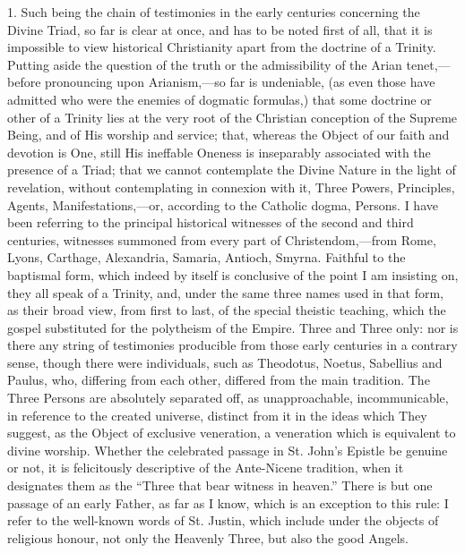 1. Such being the chain of testimonies in the early centuries
concerning the Divine Triad, so far is clear at once, and has to be
noted first of all, that it is impossible to view historical
Christianity apart from the doctrine of a Trinity. Putting aside the
question of the truth or the admissibility of the Arian tenet,—before
pronouncing upon Arianism,—so far is undeniable, (as even those have
admitted who were the enemies of dogmatic formulas,) that some
doctrine or other of a Trinity lies at the very root of the Christian
conception of the Supreme Being, and of His worship and service; that,
whereas the Object of our faith and devotion is One, still His
ineffable Oneness is inseparably associated with the presence of a
Triad; that we cannot contemplate the Divine Nature in the light of
revelation, without contemplating in connexion with it, Three Powers,
Principles, Agents, Manifestations,—or, according to the Catholic
dogma, Persons. I have been referring to the principal historical
witnesses of the second and third centuries, witnesses summoned from
every part of Christendom,—from Rome, Lyons, Carthage, Alexandria,
Samaria, Antioch, Smyrna. Faithful to the baptismal form, which indeed
by itself is conclusive of the point I am insisting on, they all speak
of a Trinity, and, under the same three names used in that form, as
their broad view, from first to last, of the special theistic
teaching, which the gospel substituted for the polytheism of the
Empire. Three and Three only: nor is there any string of testimonies
producible from those early centuries in a contrary sense, though
there were individuals, such as Theodotus, Noetus, Sabellius and
Paulus, who, differing from each other, differed from the main
tradition. The Three Persons are absolutely separated off, as
unapproachable, incommunicable, in reference to the created universe,
distinct from it in the ideas which They suggest, as the Object of
exclusive veneration, a veneration which is equivalent to divine
worship. Whether the celebrated passage in St. John's Epistle be
genuine or not, it is felicitously descriptive of the Ante-Nicene
tradition, when it designates them as the ``Three that bear
witness in heaven.'' There is but one passage of an early Father,
as far as I know, which is an exception to this rule: I refer to the
well-known words of St. Justin, which include under the objects of
religious honour, not only the Heavenly Three, but also the good
Angels.

